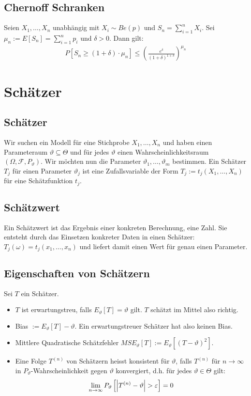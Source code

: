 \documentclass[8pt]{extarticle}
\newcommand{\F}{\mathcal{F}}
\newcommand{\vt}{\vartheta}
\newcommand{\ra}{\rightarrow}
\newcommand{\Sn}{\sum_{i = 1}^n}
\newcommand{\zufallsvariablen}{X_1, \dots, X_n}
\begin{document}
\begin{multicols*}{3}
  \subsection*{Chernoff Schranken}
  Seien $\zufallsvariablen$ unabhängig mit $X_i \sim Be (p)$ und $S_n = \Sn X_i$.
  Sei $\mu_n := E[S_n] = \Sn p_i$ und $\delta > 0$. Dann gilt:
  \begin{align*}
    P[S_n \geq  (1 + \delta) \cdot \mu_n] \leq \left( \frac{e^\delta}{ (1+\delta)^{1 + \delta}} \right)^{\mu_n}
  \end{align*}
  \hypertarget{sec:3}{\section{Schätzer}}
  \subsection*{Schätzer}
  Wir suchen ein Modell für eine Stichprobe $\zufallsvariablen$ und haben einen
  Parameteraum $\vartheta \subseteq \varTheta$ und für jedes $\vt$ einen
  Wahrscheinlichkeitsraum $ (\Omega, \F, P_\vt)$. Wir möchten nun die Parameter
  $\vt_1, \dots, \vt_m$ bestimmen. Ein Schätzer $T_j$ für einen Parameter $\vt_j$
  ist eine Zufallsvariable der Form $T_j := t_j (\zufallsvariablen)$ für eine
  Schätzfunktion $t_j$.
  \subsection*{Schätzwert}
  Ein Schätzwert ist das Ergebnis einer konkreten Berechnung, eine Zahl. Sie
  entsteht durch das Einsetzen konkreter Daten in einen Schätzer: $T_j (\omega) =
    t_j (x_1, \dots, x_n)$ und liefert damit einen Wert für genau einen Parameter.
  \subsection*{Eigenschaften von Schätzern}
  Sei $T$ ein Schätzer.
  \begin{itemize}
    \item $T$ ist erwartungstreu, falls $E_\vt[T] = \vt$ gilt. $T$ schätzt
          im Mittel also richtig.
    \item Bias $:= E_\vt[T] - \vt$. Ein erwartungstreuer Schätzer hat also keinen Bias.
    \item Mittlere Quadratische Schätzfehler $MSE_\vt[T] := E_\vt[ (T - \vt)^2]$.
    \item Eine Folge $T^{ (n)}$ von Schätzern heisst konsistent für $\vt$, falls $T^{ (n)}$
          für $n \ra \infty$ in $P_\vt$-Wahrscheinlichkeit gegen $\vt$ konvergiert, d.h.
          für jedes $\vt \in \varTheta$ gilt:
          \begin{align*}
            \lim_{n \ra \infty} P_\vt \left[ \abs{T^{ (n)} - \vt} > \varepsilon \right] = 0
          \end{align*}
  \end{itemize}

\end{multicols*}
\end{document}
